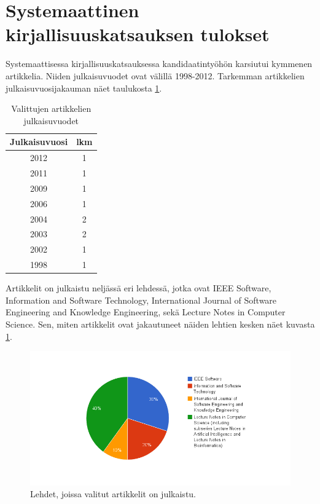 \section{Systemaattinen kirjallisuuskatsauksen tulokset}
Systemaattisessa kirjallisuuskatsauksessa kandidaatintyöhön karsiutui kymmenen artikkelia. Niiden julkaisuvuodet ovat välillä 1998-2012. Tarkemman artikkelien julkaisuvuosijakauman näet taulukosta \ref{tab:julkaisuvuodet}.
\begin{table}
    \begin{tabular}{|c|c|}
        \hline
        \textbf{Julkaisuvuosi} & \textbf{lkm} \\ \hline
	2012	& 1 \\ \hline
	2011	& 1 \\ \hline
	2009	& 1 \\ \hline
	2006	& 1 \\ \hline
	2004	& 2 \\ \hline
	2003	& 2 \\ \hline
	2002	& 1 \\ \hline
	1998	& 1 \\ \hline
    \end{tabular}
    \caption{Valittujen artikkelien julkaisuvuodet}
    \label{tab:julkaisuvuodet}
\end{table}

Artikkelit on julkaistu neljässä eri lehdessä, jotka ovat IEEE Software, Information and Software Technology, International Journal of Software Engineering and Knowledge Engineering, sekä Lecture Notes in Computer Science. Sen, miten artikkelit ovat jakautuneet näiden lehtien kesken näet kuvasta \ref{artikkeli_lehdet_pie}.
\begin{figure}[ht!]
\centering
\includegraphics[width=200mm]{artikkelien_lehdet.png}
\caption{Lehdet, joissa valitut artikkelit on julkaistu.}
\label{artikkeli_lehdet_pie}
\end{figure}

